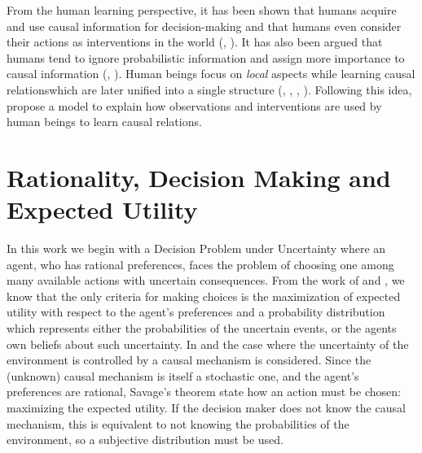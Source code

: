 \documentclass[letterpaper]{article}
\begin{document}
From the human learning perspective, it has been shown that humans acquire and use causal information for decision-making and that humans even consider their actions as interventions in the world (\cite{hagmayer2009decision}, \cite{wellen2012learning} \cite{hagmayer2013repeated}). It has also been argued that humans tend to ignore probabilistic information and assign more importance to causal information (\cite{tversky1980causal}, \cite{pearl2009causality}). Human beings focus on \textit{local} aspects while learning causal relationswhich are later unified into a single structure (\cite{fernbach2009causal}, \cite{waldmann2008causal}, \cite{wellen2012learning}, \cite{danks2014unifying}). Following this idea, \cite{wellen2012learning} propose a model to explain how observations  and interventions are used by human beings to learn causal relations. 

\section{Rationality, Decision Making and Expected Utility}
In this work we begin with a Decision Problem under Uncertainty where an agent, who has rational preferences, faces the problem of choosing one among many available actions with uncertain consequences. From the work of \cite{von1944theory} and \cite{savage1954the}, we know that the only criteria for making choices is the maximization of expected utility with respect to the agent's preferences and a probability distribution which represents either the probabilities of the uncertain events, or the agents own beliefs about such uncertainty. In \cite{gonzalez2018playing} and \cite{2019arXiv190202279G} the case where the uncertainty of the environment is controlled by a causal mechanism is considered. Since the (unknown) causal mechanism is itself a stochastic one, and the agent's preferences are rational, Savage's theorem state how an action must be chosen: maximizing the expected utility. If the decision maker does not know the causal mechanism, this is equivalent to not knowing the probabilities of the environment, so a subjective distribution must be used. 
\end{document}
